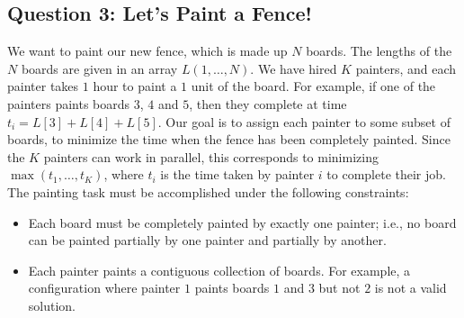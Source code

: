 \subsection*{Question 3: Let's Paint a Fence!}

We want to paint our new fence, which is made up $N$ boards. The
lengths of the $N$ boards are given in an array
$L(1,\ldots,N)$. We have hired $K$ painters, and
each painter takes $1$ hour to paint a $1$ unit of the board. For example,
if one of the painters paints boards $3$, $4$ and $5$, then they
complete at time $t_i=L[3]+L[4]+L[5]$. Our goal is to assign each
painter to some subset of boards, to minimize the time when the fence
has been completely painted. Since the $K$ painters can work in
parallel, this corresponds to minimizing $\max(t_1,\ldots,t_K)$, where
$t_i$ is the time taken by painter $i$ to complete their job. The
painting task must be accomplished under the following constraints:
\begin{itemize}
    \item Each board must be completely painted by exactly one painter;
      i.e., no board can be painted partially by one painter and partially
      by another.
    \item Each painter paints a contiguous collection of boards.  For example, a
      configuration where painter $1$ paints boards $1$ and $3$ but not
      $2$ is not a valid solution.
\end{itemize}

